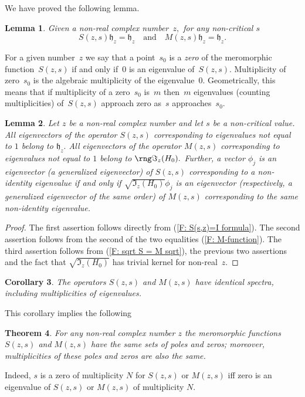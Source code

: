 \documentclass[11pt]{amsart}
\newtheorem{thm}{Theorem}                     [section]
\newtheorem{lemma}[thm]{Lemma}
\newtheorem{cor}[thm]{Corollary}
\numberwithin{equation}{section}
\begin{document}
We have proved the following lemma.
\begin{lemma} \label{L: S Ez=Ez} Given a non-real complex number~$z,$ for any non-critical $s$
$$
  S(z,s) {\mathfrak h_z} = {\mathfrak h_z} \quad \text{and} \quad M(z,s) {\mathfrak h_z} = {\mathfrak h_z}.
$$
\end{lemma}
\bigskip

For a given number~$z$ we say that a point~$s_0$ is a \emph{zero} of the meromorphic function~$S(z,s)$ if and only if~$0$ is an eigenvalue of~$S(z,s).$
Multiplicity of zero~$s_0$ is the algebraic multiplicity of the eigenvalue~$0.$ Geometrically, this means that if multiplicity of a zero~$s_0$
is~$m$ then~$m$ eigenvalues (counting multiplicities) of~$S(z,s)$ approach zero as~$s$ approaches~$s_0.$

\begin{lemma} Let $z$ be a non-real complex number and let $s$ be a non-critical value.
All eigenvectors of the operator $S(z,s)$ corresponding to eigenvalues not equal to $1$ belong to ${\mathfrak h_z}.$
All eigenvectors of the operator $M(z,s)$ corresponding to eigenvalues not equal to $1$ belong to $\rng \Im_z(H_0).$
Further, a vector $\phi_j$ is an eigenvector (a generalized eigenvector) of $S(z,s)$ corresponding to a non-identity
eigenvalue if and only if $\sqrt{\Im_z(H_0)} \phi_j$ is an eigenvector
(respectively, a generalized eigenvector of the same order) of $M(z,s)$ corresponding to the same non-identity eigenvalue.
\end{lemma}
\begin{proof} The first assertion follows directly from (\ref{F: S(s,z)=I formula}).
The second assertion follows from the second of the two equalities (\ref{F: M-function}).
The third assertion follows from (\ref{F: sqrt S = M sqrt}), the previous two assertions and the fact that $\sqrt{\Im_z(H_0)}$ has trivial kernel for non-real~$z.$
\end{proof}
\begin{cor} The operators $S(z,s)$ and $M(z,s)$ have identical spectra, including multiplicities of eigenvalues.
\end{cor}
This corollary implies the following
\begin{thm} \label{T: poles and zeros of S and M} For any non-real complex number $z$ the meromorphic functions $S(z,s)$
and $M(z,s)$ have the same sets of poles and zeros; moreover, multiplicities of these poles and zeros are also the same.
\end{thm}
Indeed, $s$ is a zero of multiplicity $N$ for $S(z,s)$ or $M(z,s)$ iff zero is an eigenvalue
of $S(z,s)$ or $M(z,s)$ of multiplicity $N.$
\end{document}
